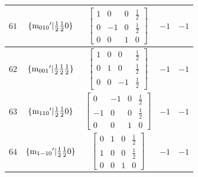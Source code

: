 \documentclass[fleqn,8pt]{jsarticle}
\begin{document}
\begin{longtable}{ccccc}
$ 61 $ & $ \{{\rm m}_{010}{}'|\frac{1}{2} \frac{1}{2} 0\} $ & $ \begin{bmatrix} 1 & 0 & 0 & \frac{1}{2} \\ 0 & -1 & 0 & \frac{1}{2} \\ 0 & 0 & 1 & 0 \end{bmatrix} $ & $ -1 $ & $ -1 $ \\ \hline
$ 62 $ & $ \{{\rm m}_{001}{}'|\frac{1}{2} \frac{1}{2} \frac{1}{2}\} $ & $ \begin{bmatrix} 1 & 0 & 0 & \frac{1}{2} \\ 0 & 1 & 0 & \frac{1}{2} \\ 0 & 0 & -1 & \frac{1}{2} \end{bmatrix} $ & $ -1 $ & $ -1 $ \\ \hline
$ 63 $ & $ \{{\rm m}_{110}{}'|\frac{1}{2} \frac{1}{2} 0\} $ & $ \begin{bmatrix} 0 & -1 & 0 & \frac{1}{2} \\ -1 & 0 & 0 & \frac{1}{2} \\ 0 & 0 & 1 & 0 \end{bmatrix} $ & $ -1 $ & $ -1 $ \\ \hline
$ 64 $ & $ \{{\rm m}_{1-10}{}'|\frac{1}{2} \frac{1}{2} 0\} $ & $ \begin{bmatrix} 0 & 1 & 0 & \frac{1}{2} \\ 1 & 0 & 0 & \frac{1}{2} \\ 0 & 0 & 1 & 0 \end{bmatrix} $ & $ -1 $ & $ -1 $ \\
\end{longtable}
\end{document}
